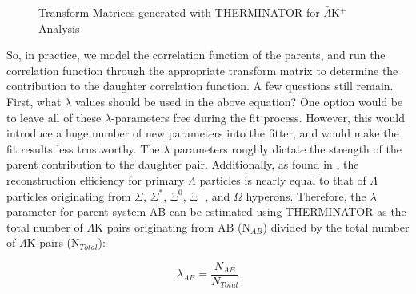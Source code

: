 \documentclass[../AnalysisNoteJBuxton.tex]{subfiles}
\begin{document}
\begin{figure}[h!]
  \caption[Transform Matrices for $\bar{\Lambda}$K$^{+}$ Analysis]{Transform Matrices generated with THERMINATOR for $\bar{\Lambda}$K$^{+}$ Analysis}
  \label{fig:TransformMatricesALamKchP}
\end{figure}


So, in practice, we model the correlation function of the parents, and run the correlation function through the appropriate transform matrix to determine the contribution to the daughter correlation function.  A few questions still remain.  First, what $\lambda$ values should be used in the above equation?  One option would be to leave all of these $\lambda$-parameters free during the fit process.  However, this would introduce a huge number of new parameters into the fitter, and would make the fit results less trustworthy.  The $\lambda$ parameters roughly dictate the strength of the parent contribution to the daughter pair.  Additionally, as found in \cite{Salzwedel:2241303}, the reconstruction efficiency for primary $\Lambda$ particles is nearly equal to that of $\Lambda$ particles originating from $\Sigma$, $\Sigma^{*}$, $\Xi^{0}$, $\Xi^{-}$, and $\Omega$ hyperons.  Therefore, the $\lambda$ parameter for parent system AB can be estimated using THERMINATOR as the total number of $\Lambda$K pairs originating from AB (N$_{AB}$) divided by the total number of $\Lambda$K pairs (N$_{Total}$):

\begin{equation}
\lambda_{AB} = \frac{N_{AB}}{N_{Total}}
\end{equation}
\end{document}
